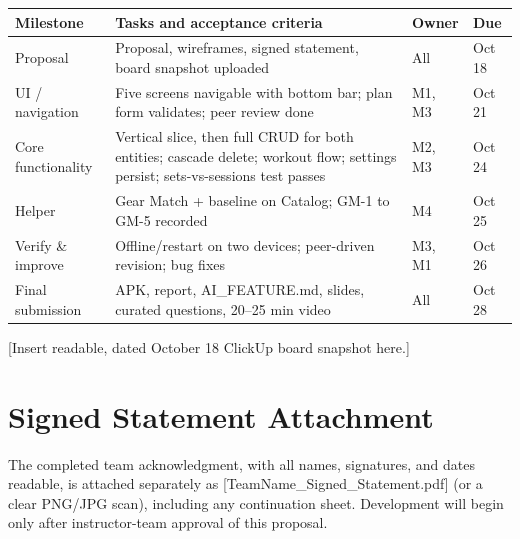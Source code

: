 \documentclass[11pt]{article}
\newcommand{\ph}[1]{\textcolor{ph}{[#1]}}
\begin{document}
\begin{tabularx}{\textwidth}{@{}P{3.1cm}L P{2.1cm}P{1.8cm}@{}}
\toprule
\textbf{Milestone} & \textbf{Tasks and acceptance criteria} & \textbf{Owner} & \textbf{Due} \\
\midrule
Proposal & Proposal, wireframes, signed statement, board snapshot uploaded & All & Oct 18 \\
UI / navigation & Five screens navigable with bottom bar; plan form validates; peer review done & M1, M3 & Oct 21 \\
Core functionality & Vertical slice, then full CRUD for both entities; cascade delete; workout flow; settings persist; sets-vs-sessions test passes & M2, M3 & Oct 24 \\
Helper & Gear Match + baseline on Catalog; GM-1 to GM-5 recorded & M4 & Oct 25 \\
Verify \& improve & Offline/restart on two devices; peer-driven revision; bug fixes & M3, M1 & Oct 26 \\
Final submission & APK, report, AI\_FEATURE.md, slides, curated questions, 20--25 min video & All & Oct 28 \\
\bottomrule
\end{tabularx}

\medskip
\noindent\ph{Insert readable, dated October 18 ClickUp board snapshot here.}

\section{Signed Statement Attachment}
The completed team acknowledgment, with all names, signatures, and dates readable, is attached separately as \ph{TeamName\_Signed\_Statement.pdf} (or a clear PNG/JPG scan), including any continuation sheet. Development will begin only after instructor-team approval of this proposal.
\end{document}
